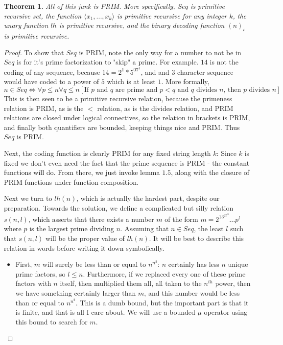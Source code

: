 \documentclass{article}
\theoremstyle{definition}
\theoremstyle{plain}
\theoremstyle{theorem}
\newtheorem{theorem}{Theorem}[section]
\begin{document}
\begin{theorem}
    All of this junk is PRIM. More specifically, $Seq$ is primitive recursive set, the function $\langle x_1,...,x_k \rangle$ is primitive recursive for any integer $k$, the unary function $lh$ is primitive recursive, and the binary decoding function $(n)_i$ is primitive recursive. 
\end{theorem}
\begin{proof}
    To show that $Seq$ is PRIM, note the only way for a number to not be in $Seq$ is for it's prime factorization to "skip" a prime. For example. $14$ is not the coding of any sequence, because $14 = 2^1*5^07^1$, and and $3$ character sequence would have coded to a power of $5$ which is at least $1$. More formally, 
    \[ n \in Seq \iff \forall p \leq n \forall q \leq n [\textrm{If $p$ and $q$ are prime and $p < q$ and $q$ divides $n$, then $p$ divides $n$}] \]
    This is then seen to be a primitive recursive relation, because the primeness relation is PRIM, as is the $<$ relation, as is the divides relation, and PRIM relations are closed under logical connectives, so the relation in brackets is PRIM, and finally both quantifiers are bounded, keeping things nice and PRIM. Thus $Seq$ is PRIM.
    \par Next, the coding function is clearly PRIM for any fixed string length $k$: Since $k$ is fixed we don't even need the fact that the prime sequence is PRIM - the constant functions will do. From there, we just invoke lemma $1.5$, along with the closure of PRIM functions under function composition. 
    \par Next we turn to $lh(n)$, which is actually the hardest part, despite our preparation. Towards the solution, we define a complicated but silly relation $s(n,l)$, which asserts that there exists a number $m$ of the form $m = 2^13^25^3...p^l$ where $p$ is the largest prime dividing $n$. Assuming that $n \in Seq$, the least $l$ such that $s(n,l)$ will be the proper value of $lh(n)$. It will be best to describe this relation in words before writing it down symbolically. 
    \begin{itemize}
        \item First, $m$ will surely be less than or equal to $n^{n^2}$: $n$ certainly has less $n$ unique prime factors, so $l \leq n$. Furthermore, if we replaced every one of these prime factors with $n$ itself, then multiplied them all, all taken to the $n^{th}$ power, then we have something certainly larger than $m$, and this number would be less than or equal to $n^{n^2}$. This is a dumb bound, but the important part is that it is finite, and that is all I care about. We will use a bounded $\mu$ operator using this bound to search for $m$.

\end{itemize}
\end{proof}
\end{document}
